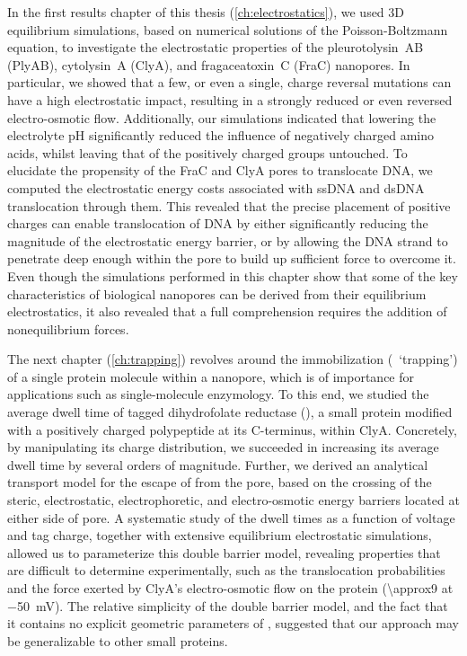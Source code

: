 In the first results chapter of this thesis (\cref{ch:electrostatics}), we used 3D equilibrium simulations,
based on numerical solutions of the Poisson-Boltzmann equation, to investigate the electrostatic properties of
the pleurotolysin~AB (PlyAB), cytolysin~A (ClyA), and fragaceatoxin~C (FraC) nanopores. In particular, we
showed that a few, or even a single, charge reversal mutations can have a high electrostatic impact, resulting
in a strongly reduced or even reversed electro-osmotic flow. Additionally, our simulations indicated that
lowering the electrolyte pH significantly reduced the influence of negatively charged amino acids, whilst
leaving that of the positively charged groups untouched. To elucidate the propensity of the FraC and ClyA
pores to translocate DNA, we computed the electrostatic energy costs associated with ssDNA and dsDNA
translocation through them. This revealed that the precise placement of positive charges can enable
translocation of DNA by either significantly reducing the magnitude of the electrostatic energy barrier, or by
allowing the DNA strand to penetrate deep enough within the pore to build up sufficient force to overcome it.
Even though the simulations performed in this chapter show that some of the key characteristics of biological
nanopores can be derived from their equilibrium electrostatics, it also revealed that a full comprehension
requires the addition of nonequilibrium forces.

The next chapter (\cref{ch:trapping}) revolves around the immobilization (\ie~`trapping') of a single protein
molecule within a nanopore, which is of importance for applications such as single-molecule enzymology. To
this end, we studied the average dwell time of tagged dihydrofolate reductase (\DHFRt{}), a small protein
modified with a positively charged polypeptide at its C-terminus, within ClyA. Concretely, by manipulating its
charge distribution, we succeeded in increasing its average dwell time by several orders of magnitude.
Further, we derived an analytical transport model for the escape of \DHFRt{} from the pore, based on the
crossing of the steric, electrostatic, electrophoretic, and electro-osmotic energy barriers located at either
side of pore. A systematic study of the dwell times as a function of voltage and tag charge, together with
extensive equilibrium electrostatic simulations, allowed us to parameterize this double barrier model,
revealing properties that are difficult to determine experimentally, such as the translocation probabilities
and the force exerted by ClyA's electro-osmotic flow on the protein (\SI{\approx9}{\pN} at \SI{-50}{\mV}). The
relative simplicity of the double barrier model, and the fact that it contains no explicit geometric
parameters of \DHFRt{}, suggested that our approach may be generalizable to other small proteins.

